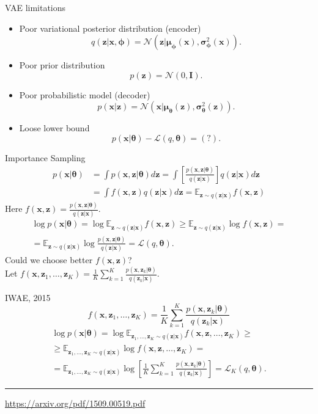 \documentclass{beamer}
\newcommand{\bx}{\mathbf{x}}
\newcommand{\bz}{\mathbf{z}}
\newcommand{\bmu}{\boldsymbol{\mu}}
\newcommand{\bsigma}{\boldsymbol{\sigma}}
\newcommand{\btheta}{\boldsymbol{\theta}}
\newcommand{\bphi}{\boldsymbol{\phi}}
\begin{document}
\begin{frame}{VAE limitations}
\begin{itemize}
	\item Poor variational posterior distribution (encoder)
	\[
		q(\bz | \bx, \bphi) = \mathcal{N}(\bz| \bmu_{\bphi}(\bx), \bsigma^2_{\bphi}(\bx)).
	\]
	\item Poor prior distribution
	\[
		p(\bz) = \mathcal{N}(0, \mathbf{I}).
	\]
	\item Poor probabilistic model (decoder)
	\[
		p(\bx | \bz) = \mathcal{N}(\bx| \bmu_{\btheta}(\bz), \bsigma^2_{\btheta}(\bz)).
	\]
	\item Loose lower bound
	\[
		p(\bx | \btheta) - \mathcal{L}(q, \btheta) = (?).
	\]
\end{itemize}
\end{frame}
\begin{frame}{Importance Sampling}
\vspace{-0.5cm}
\begin{align*}
    p(\bx | \btheta) &= \int p(\bx, \bz | \btheta) d\bz = \int \left[\frac{p(\bx, \bz | \btheta)}{q(\bz | \bx)} \right] q(\bz | \bx) d\bz \\
    &= \int f(\bx, \bz) q(\bz | \bx) d\bz = \mathbb{E}_{\bz \sim q(\bz | \bx)} f(\bx, \bz)
\end{align*}
Here $f(\bx, \bz) = \frac{p(\bx, \bz | \btheta)}{q(\bz | \bx)}$.
\begin{multline*}
    \log p(\bx | \btheta) = \log \mathbb{E}_{\bz \sim q(\bz | \bx)} f(\bx, \bz)
    \geq \mathbb{E}_{\bz \sim q(\bz | \bx)} \log f(\bx, \bz) = \\
    = \mathbb{E}_{\bz \sim q(\bz | \bx)} \log \frac{p(\bx, \bz | \btheta)}{q(\bz | \bx)} = \mathcal{L}(q, \btheta).
\end{multline*}
Could we choose better $f(\bx, \bz)$? \\
\vspace{0.2cm}
Let $f(\bx, \bz_1, \dots, \bz_K) = \frac{1}{K} \sum_{k=1}^K \frac{p(\bx, \bz_k | \btheta)}{q(\bz_k | \bx)}$.
\end{frame}
\begin{frame}{IWAE, 2015}
\[
    f(\bx, \bz_1, \dots, \bz_K) = \frac{1}{K} \sum_{k=1}^K \frac{p(\bx, \bz_k | \btheta)}{q(\bz_k | \bx)}
\]
\begin{multline*}
    \log p(\bx | \btheta) = \log \mathbb{E}_{\bz_1, \dots, \bz_K \sim q(\bz | \bx)} f(\bx, \bz, \dots, \bz_K) \geq \\
    \geq \mathbb{E}_{\bz_1, \dots, \bz_K \sim q(\bz | \bx)} \log f(\bx, \bz, \dots, \bz_K) = \\
    = \mathbb{E}_{\bz_1, \dots, \bz_K \sim q(\bz | \bx)} \log \left[\frac{1}{K} \sum_{k=1}^K\frac{p(\bx, \bz_k | \btheta)}{q(\bz_k | \bx)} \right] = \mathcal{L}_K(q, \btheta).
\end{multline*}
\vfill
\hrule\medskip
{\scriptsize \href{https://arxiv.org/pdf/1509.00519.pdf}{https://arxiv.org/pdf/1509.00519.pdf}}
\end{frame}
\end{document}

